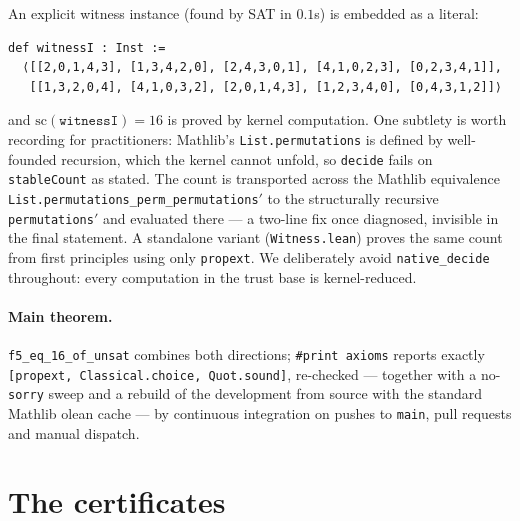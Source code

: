 \documentclass[11pt]{article}
\begin{document}
An explicit witness instance (found by SAT in $0.1$s) is embedded as a literal:
\begin{verbatim}
def witnessI : Inst :=
  ⟨[[2,0,1,4,3], [1,3,4,2,0], [2,4,3,0,1], [4,1,0,2,3], [0,2,3,4,1]],
   [[1,3,2,0,4], [4,1,0,3,2], [2,0,1,4,3], [1,2,3,4,0], [0,4,3,1,2]]⟩
\end{verbatim}
and $\mathrm{sc}(\texttt{witnessI}) = 16$ is proved by kernel computation. One subtlety is
worth recording for practitioners: Mathlib's \texttt{List.permutations} is defined by
well-founded recursion, which the kernel cannot unfold, so \texttt{decide} fails on
\texttt{stableCount} as stated. The count is transported across the Mathlib equivalence
\texttt{List.permutations\_perm\_permutations\('\)} to the structurally recursive
\texttt{permutations\('\)} and evaluated there --- a two-line fix once diagnosed, invisible
in the final statement. A standalone variant (\texttt{Witness.lean}) proves the same count
from first principles using only \texttt{propext}. We deliberately avoid
\texttt{native\_decide} throughout: every computation in the trust base is kernel-reduced.

\paragraph{Main theorem.} \texttt{f5\_eq\_16\_of\_unsat} combines both directions;
\texttt{\#print axioms} reports exactly \texttt{[propext, Classical.choice, Quot.sound]},
re-checked --- together with a no-\texttt{sorry} sweep and a rebuild of the development from
source with the standard Mathlib olean cache --- by continuous integration on pushes to
\texttt{main}, pull requests and manual dispatch.

\section{The certificates}\label{sec:cnf}
\end{document}

